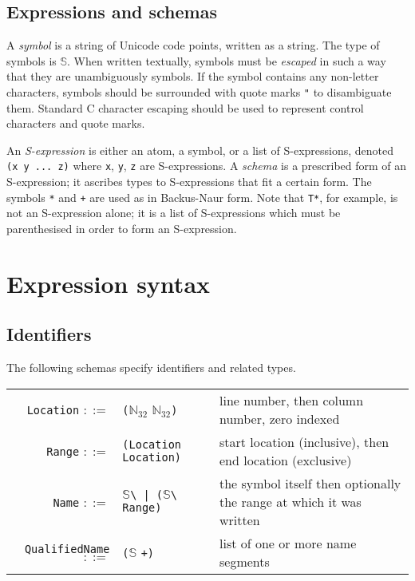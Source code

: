 \documentclass[UKenglish, 11pt, a4paper, parskip=half]{scrbook}
\newcommand{\inlinecode}[1]{\lstinline{#1}}
\begin{document}
\subsection{Expressions and schemas}
\begin{defn}
    A \textit{symbol} is a string of Unicode code points, written as a string.
    The type of symbols is \( \mathbb S \).
    When written textually, symbols must be \textit{escaped} in such a way that they are unambiguously symbols.
    If the symbol contains any non-letter characters, symbols should be surrounded with quote marks \inlinecode{"} to disambiguate them.
    Standard C character escaping should be used to represent control characters and quote marks.
\end{defn}
\begin{defn}
    An \textit{S-expression} is either an atom, a symbol, or a list of S-expressions, denoted \inlinecode{(x y ... z)} where \inlinecode{x}, \inlinecode{y}, \inlinecode{z} are S-expressions.
    A \textit{schema} is a prescribed form of an S-expression; it ascribes types to S-expressions that fit a certain form.
    The symbols \inlinecode{*} and \inlinecode{+} are used as in Backus-Naur form.
    Note that \inlinecode{T*}, for example, is not an S-expression alone; it is a list of S-expressions which must be parenthesised in order to form an S-expression.
\end{defn}

\section{Expression syntax}

\subsection{Identifiers}

The following schemas specify identifiers and related types.

\begin{tabular}{r l p{6cm}}
    \inlinecode{Location} \( ::= \) & \inlinecode{(}\( \mathbb N_{32} \) \( \mathbb N_{32} \)\inlinecode{)} & line number, then column number, zero indexed \\
    \inlinecode{Range} \( ::= \) & \inlinecode{(Location Location)} & start location (inclusive), then end location (exclusive) \\
    \inlinecode{Name} \( ::= \) & \( \mathbb S \)\inlinecode{\ | (}\( \mathbb S \)\inlinecode{\ Range)} & the symbol itself then optionally the range at which it was written \\
    \inlinecode{QualifiedName} \( ::= \) & \inlinecode{(}\( \mathbb S \) \inlinecode{+)} & list of one or more name segments
\end{tabular}
\end{document}
